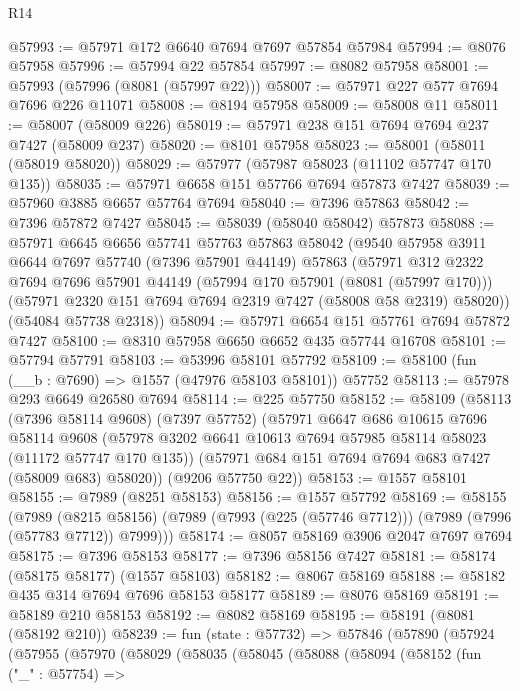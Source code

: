 \begin{lexlean}{R14}
\begin{coremodule}
@57993 := @57971 @172 @6640 @7694 @7697 @57854 @57984
@57994 := @8076 @57958
@57996 := @57994 @22 @57854
@57997 := @8082 @57958
@58001 := @57993 (@57996 (@8081 (@57997 @22)))
@58007 := @57971 @227 @577 @7694 @7696 @226 @11071
@58008 := @8194 @57958
@58009 := @58008 @11
@58011 := @58007 (@58009 @226)
@58019 := @57971 @238 @151 @7694 @7694 @237 @7427 (@58009 @237)
@58020 := @8101 @57958
@58023 := @58001 (@58011 (@58019 @58020))
@58029 := @57977 (@57987 @58023 (@11102 @57747 @170 @135))
@58035 := @57971 @6658 @151 @57766 @7694 @57873 @7427
@58039 := @57960 @3885 @6657 @57764 @7694
@58040 := @7396 @57863
@58042 := @7396 @57872 @7427
@58045 := @58039 (@58040 @58042) @57873
@58088 := @57971
    @6645
    @6656
    @57741
    @57763
    @57863
    @58042
    (@9540
      @57958
      @3911
      @6644
      @7697
      @57740
      (@7396 @57901 @44149)
      @57863
      (@57971
        @312
        @2322
        @7694
        @7696
        @57901
        @44149
        (@57994 @170 @57901 (@8081 (@57997 @170)))
        (@57971 @2320 @151 @7694 @7694 @2319 @7427 (@58008 @58 @2319) @58020))
      (@54084 @57738 @2318))
@58094 := @57971 @6654 @151 @57761 @7694 @57872 @7427
@58100 := @8310 @57958 @6650 @6652 @435 @57744 @16708
@58101 := @57794 @57791
@58103 := @53996 @58101 @57792
@58109 := @58100 (fun (__b : @7690) => @1557 (@47976 @58103 @58101)) @57752
@58113 := @57978 @293 @6649 @26580 @7694
@58114 := @225 @57750
@58152 := @58109
    (@58113
      (@7396 @58114 @9608)
      (@7397 @57752)
      (@57971
        @6647
        @686
        @10615
        @7696
        @58114
        @9608
        (@57978 @3202 @6641 @10613 @7694 @57985 @58114 @58023 (@11172 @57747 @170 @135))
        (@57971 @684 @151 @7694 @7694 @683 @7427 (@58009 @683) @58020))
      (@9206 @57750 @22))
@58153 := @1557 @58101
@58155 := @7989 (@8251 @58153)
@58156 := @1557 @57792
@58169 := @58155
    (@7989
      (@8215 @58156)
      (@7989 (@7993 (@225 (@57746 @7712))) (@7989 (@7996 (@57783 @7712)) @7999)))
@58174 := @8057 @58169 @3906 @2047 @7697 @7694
@58175 := @7396 @58153
@58177 := @7396 @58156 @7427
@58181 := @58174 (@58175 @58177) (@1557 @58103)
@58182 := @8067 @58169
@58188 := @58182 @435 @314 @7694 @7696 @58153 @58177
@58189 := @8076 @58169
@58191 := @58189 @210 @58153
@58192 := @8082 @58169
@58195 := @58191 (@8081 (@58192 @210))
@58239 := fun (state : @57732) =>
  @57846
    (@57890
      (@57924
        (@57955
          (@57970
            (@58029
              (@58035
                (@58045
                  (@58088
                    (@58094
                      (@58152
                        (fun ("_" : @57754) =>

\end{coremodule}
\end{lexlean}
